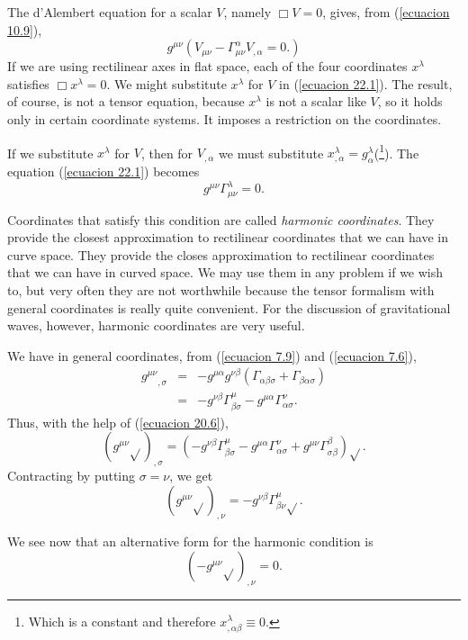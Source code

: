 The d'Alembert equation for a scalar $V$, namely $\Box V = 0$, gives, from (\ref{ecuacion 10.9}),
\begin{equation}
 \label{ecuacion 22.1}
 g^{\mu\nu}\left(
    V_{\mu\nu} - \Gamma^\alpha_{\mu\nu} V_{,\alpha} = 0.
 \right)
\end{equation}
If we are using rectilinear axes in flat space, each of the four coordinates $x^\lambda$ satisfies $\Box x^\lambda = 
0$. We might substitute $x^\lambda$ for $V$ in (\ref{ecuacion 22.1}). The result, of course, is not a tensor equation, 
because $x^\lambda$ is not a scalar like $V$, so it holds only in certain coordinate systems. It imposes a restriction 
on the coordinates.

If we substitute $x^\lambda$ for $V$, then for $V_{,\alpha}$ we must substitute $x^\lambda_{,\alpha} = 
g^\lambda_{\alpha}$(\footnote{Which is a constant and therefore $x^\lambda_{,\alpha\beta}\equiv 0$.}). The equation 
(\ref{ecuacion 22.1}) becomes
\begin{equation}
 \label{ecuacion 22.2}
 g^{\mu\nu} \Gamma^\lambda_{\mu\nu} = 0.
\end{equation}

Coordinates that satisfy this condition are called \emph{harmonic coordinates}. They provide the closest approximation 
to rectilinear coordinates that we can have in curve space. They provide the closes approximation to rectilinear 
coordinates that we can have in curved space. We may use them in any problem if we wish to, but very often they are not 
worthwhile because the tensor formalism with general coordinates is really quite convenient. For the discussion of 
gravitational waves, however, harmonic coordinates are very useful.

We have in general coordinates, from (\ref{ecuacion 7.9}) and (\ref{ecuacion 7.6}),
\begin{equation}
 \label{ecuacion 22.3}
 \begin{array}{rcl}
  {g^{\mu\nu}}_{,\sigma} & = & - g^{\mu\alpha}g^{\nu\beta}\left(
    \Gamma_{\alpha\beta\sigma} + \Gamma_{\beta\alpha\sigma}
  \right)\\
  & = & - g^{\nu\beta} \Gamma^\mu_{\beta\sigma} - g^{\mu\alpha} \Gamma^\nu_{\alpha\sigma}.
 \end{array}
\end{equation}
Thus, with the help of (\ref{ecuacion 20.6}),
\begin{equation}
 \label{ecuacion 22.4}
 \left(g^{\mu\nu}\sqrt{}\right)_{,\sigma} = \left( 
 - g^{\nu\beta}  \Gamma^{\mu}_{\beta\sigma}
 - g^{\mu\alpha} \Gamma^{\nu}_{\alpha\sigma}
 + g^{\mu\nu} \Gamma^\beta_{\sigma\beta}
 \right) \sqrt{}.
\end{equation}
Contracting by putting $\sigma = \nu$, we get
\begin{equation}
 \label{ecuacion 22.5}
 \left(g^{\mu\nu} \sqrt{} \right)_{,\nu} = - g^{\nu\beta}\Gamma^\mu_{\beta\nu}\sqrt{}.
\end{equation}

We see now that an alternative form for the harmonic condition is
\begin{equation}
 \label{ecuacion 22.6}
 \left(
 - g^{\mu\nu} \sqrt{}
 \right)_{,\nu} = 0.
\end{equation}


